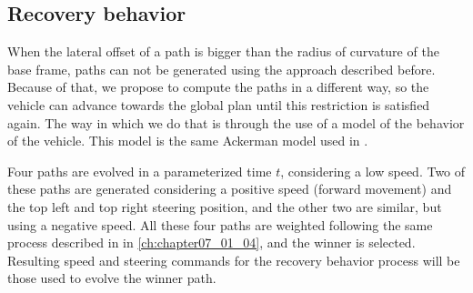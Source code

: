 \subsection{Recovery behavior}\label{ch:chapter07_01_06}

When the lateral offset of a path is bigger than the radius of curvature of the base frame, paths can not be generated using the approach described before. Because of that, we propose to compute the paths in a different way, so the vehicle can advance towards the global plan until this restriction is satisfied again. The way in which we do that is through the use of a model of the behavior of the vehicle. This model is the same Ackerman model used in \cite{espelosin2013path}.

Four paths are evolved in a parameterized time $t$, considering a low speed. Two of these paths are generated considering a positive speed (forward movement) and the top left and top right steering position, and the other two are similar, but using a negative speed. All these four paths are weighted following the same process described in in \ref{ch:chapter07_01_04}, and the winner is selected. Resulting speed and steering commands for the recovery behavior process will be those used to evolve the winner path.

